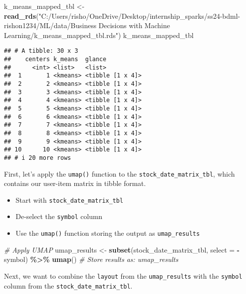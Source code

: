 \documentclass[
]{article}
\newenvironment{Shaded}{\begin{snugshade}}{\end{snugshade}}
\newcommand{\AttributeTok}[1]{\textcolor[rgb]{0.13,0.29,0.53}{#1}}
\newcommand{\CommentTok}[1]{\textcolor[rgb]{0.56,0.35,0.01}{\textit{#1}}}
\newcommand{\FunctionTok}[1]{\textcolor[rgb]{0.13,0.29,0.53}{\textbf{#1}}}
\newcommand{\NormalTok}[1]{#1}
\newcommand{\OtherTok}[1]{\textcolor[rgb]{0.56,0.35,0.01}{#1}}
\newcommand{\SpecialCharTok}[1]{\textcolor[rgb]{0.81,0.36,0.00}{\textbf{#1}}}
\newcommand{\StringTok}[1]{\textcolor[rgb]{0.31,0.60,0.02}{#1}}
\providecommand{\tightlist}{%
  \setlength{\itemsep}{0pt}\setlength{\parskip}{0pt}}
\begin{document}
\begin{Shaded}
\begin{Highlighting}[]
\NormalTok{k\_means\_mapped\_tbl }\OtherTok{\textless{}{-}} \FunctionTok{read\_rds}\NormalTok{(}\StringTok{"C:/Users/risho/OneDrive/Desktop/internship\_sparks/ss24{-}bdml{-}rishon1234/ML/data/Business Decisions with Machine Learning/k\_means\_mapped\_tbl.rds"}\NormalTok{)}
\NormalTok{k\_means\_mapped\_tbl}
\end{Highlighting}
\end{Shaded}

\begin{verbatim}
## # A tibble: 30 x 3
##    centers k_means  glance          
##      <int> <list>   <list>          
##  1       1 <kmeans> <tibble [1 x 4]>
##  2       2 <kmeans> <tibble [1 x 4]>
##  3       3 <kmeans> <tibble [1 x 4]>
##  4       4 <kmeans> <tibble [1 x 4]>
##  5       5 <kmeans> <tibble [1 x 4]>
##  6       6 <kmeans> <tibble [1 x 4]>
##  7       7 <kmeans> <tibble [1 x 4]>
##  8       8 <kmeans> <tibble [1 x 4]>
##  9       9 <kmeans> <tibble [1 x 4]>
## 10      10 <kmeans> <tibble [1 x 4]>
## # i 20 more rows
\end{verbatim}

First, let's apply the \texttt{umap()} function to the
\texttt{stock\_date\_matrix\_tbl}, which contains our user-item matrix
in tibble format.

\begin{itemize}
\tightlist
\item
  Start with \texttt{stock\_date\_matrix\_tbl}
\item
  De-select the \texttt{symbol} column
\item
  Use the \texttt{umap()} function storing the output as
  \texttt{umap\_results}
\end{itemize}

\begin{Shaded}
\begin{Highlighting}[]
\CommentTok{\# Apply UMAP}
\NormalTok{umap\_results }\OtherTok{\textless{}{-}}
    \FunctionTok{subset}\NormalTok{(stock\_date\_matrix\_tbl, }\AttributeTok{select =} \SpecialCharTok{{-}}\NormalTok{symbol) }\SpecialCharTok{\%\textgreater{}\%}
    \FunctionTok{umap}\NormalTok{()}
\CommentTok{\# Store results as: umap\_results }
\end{Highlighting}
\end{Shaded}

Next, we want to combine the \texttt{layout} from the
\texttt{umap\_results} with the \texttt{symbol} column from the
\texttt{stock\_date\_matrix\_tbl}.
\end{document}
